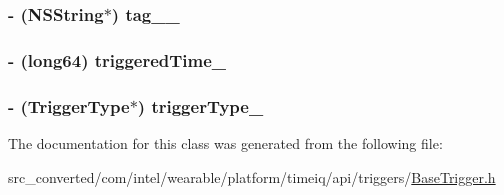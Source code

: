 \subsubsection[{tag\+\_\+\+\_\+}]{\setlength{\rightskip}{0pt plus 5cm}-\/ (N\+S\+String$\ast$) tag\+\_\+\+\_\+}\label{interface_base_trigger___base_trigger_builder_abdba7bb1d617279f0e09ce2aa14b3056}
\hypertarget{interface_base_trigger___base_trigger_builder_ab271854f368e34c4bb80c20292e9fea4}{}
\subsubsection[{triggered\+Time\+\_\+}]{\setlength{\rightskip}{0pt plus 5cm}-\/ (long64) triggered\+Time\+\_\+}\label{interface_base_trigger___base_trigger_builder_ab271854f368e34c4bb80c20292e9fea4}
\hypertarget{interface_base_trigger___base_trigger_builder_a875cc74df90c6b327dac3c98c4f2d238}{}
\subsubsection[{trigger\+Type\+\_\+}]{\setlength{\rightskip}{0pt plus 5cm}-\/ ({\bf Trigger\+Type}$\ast$) trigger\+Type\+\_\+}\label{interface_base_trigger___base_trigger_builder_a875cc74df90c6b327dac3c98c4f2d238}


The documentation for this class was generated from the following file\+:\begin{DoxyCompactItemize}
\item 
src\+\_\+converted/com/intel/wearable/platform/timeiq/api/triggers/\hyperlink{_base_trigger_8h}{Base\+Trigger.\+h}\end{DoxyCompactItemize}
